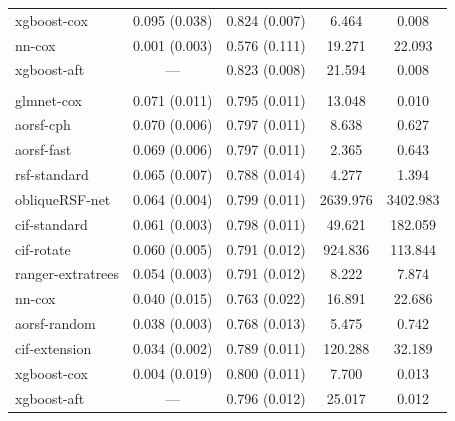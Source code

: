 \documentclass[12pt]{article}\usepackage[]{graphicx}\usepackage[]{xcolor}
\newenvironment{knitrout}{}{} %
\begin{document}
\begin{knitrout}
\begin{longtable}[t]{lcccc}
\hspace{1em}xgboost-cox & 0.095 (0.038) & 0.824 (0.007) & 6.464 & 0.008\\
\hspace{1em}nn-cox & 0.001 (0.003) & 0.576 (0.111) & 19.271 & 22.093\\
\hspace{1em}xgboost-aft & --- & 0.823 (0.008) & 21.594 & 0.008\\
\addlinespace[0.3em]
\multicolumn{5}{l}{\textit{\textbf{SPRINT; CVD death, n = 9361, p = 174}}}\\
\hline
\hspace{1em}glmnet-cox & 0.071 (0.011) & 0.795 (0.011) & 13.048 & 0.010\\
\hspace{1em}aorsf-cph & 0.070 (0.006) & 0.797 (0.011) & 8.638 & 0.627\\
\hspace{1em}aorsf-fast & 0.069 (0.006) & 0.797 (0.011) & 2.365 & 0.643\\
\hspace{1em}rsf-standard & 0.065 (0.007) & 0.788 (0.014) & 4.277 & 1.394\\
\hspace{1em}obliqueRSF-net & 0.064 (0.004) & 0.799 (0.011) & 2639.976 & 3402.983\\
\hspace{1em}cif-standard & 0.061 (0.003) & 0.798 (0.011) & 49.621 & 182.059\\
\hspace{1em}cif-rotate & 0.060 (0.005) & 0.791 (0.012) & 924.836 & 113.844\\
\hspace{1em}ranger-extratrees & 0.054 (0.003) & 0.791 (0.012) & 8.222 & 7.874\\
\hspace{1em}nn-cox & 0.040 (0.015) & 0.763 (0.022) & 16.891 & 22.686\\
\hspace{1em}aorsf-random & 0.038 (0.003) & 0.768 (0.013) & 5.475 & 0.742\\
\hspace{1em}cif-extension & 0.034 (0.002) & 0.789 (0.011) & 120.288 & 32.189\\
\hspace{1em}xgboost-cox & 0.004 (0.019) & 0.800 (0.011) & 7.700 & 0.013\\
\hspace{1em}xgboost-aft & --- & 0.796 (0.012) & 25.017 & 0.012\\

\end{longtable}
\end{knitrout}
\end{document}
